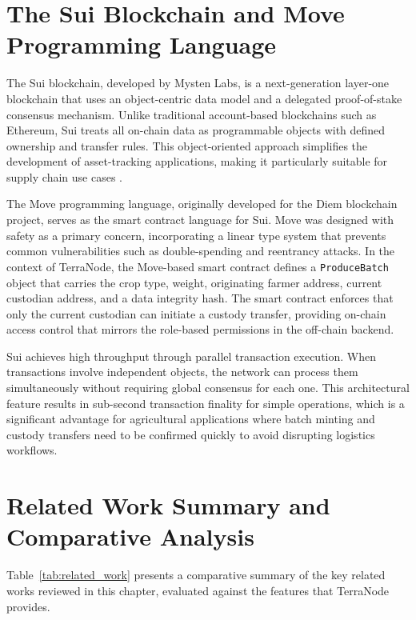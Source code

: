 \section{The Sui Blockchain and Move Programming Language}

The Sui blockchain, developed by Mysten Labs, is a next-generation layer-one blockchain that uses an object-centric data model and a delegated proof-of-stake consensus mechanism. Unlike traditional account-based blockchains such as Ethereum, Sui treats all on-chain data as programmable objects with defined ownership and transfer rules. This object-oriented approach simplifies the development of asset-tracking applications, making it particularly suitable for supply chain use cases \parencite{sui2024documentation}.

The Move programming language, originally developed for the Diem blockchain project, serves as the smart contract language for Sui. Move was designed with safety as a primary concern, incorporating a linear type system that prevents common vulnerabilities such as double-spending and reentrancy attacks. In the context of TerraNode, the Move-based smart contract defines a \texttt{ProduceBatch} object that carries the crop type, weight, originating farmer address, current custodian address, and a data integrity hash. The smart contract enforces that only the current custodian can initiate a custody transfer, providing on-chain access control that mirrors the role-based permissions in the off-chain backend.

Sui achieves high throughput through parallel transaction execution. When transactions involve independent objects, the network can process them simultaneously without requiring global consensus for each one. This architectural feature results in sub-second transaction finality for simple operations, which is a significant advantage for agricultural applications where batch minting and custody transfers need to be confirmed quickly to avoid disrupting logistics workflows.

\section{Related Work Summary and Comparative Analysis}

Table~\ref{tab:related_work} presents a comparative summary of the key related works reviewed in this chapter, evaluated against the features that TerraNode provides.


